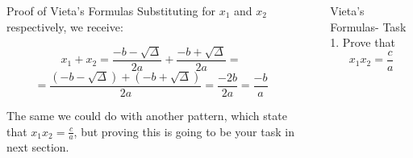 \documentclass[final]{beamer}
\newlength{\sepwid}
\newlength{\onecolwid}
\newlength{\twocolwid}
\begin{document}
\begin{frame}[t]
\begin{columns}[t]
\begin{column}{\twocolwid}
\begin{columns}[t,totalwidth=\twocolwid]
\begin{column}{\onecolwid}
\begin{block}{ Proof of Vieta's Formulas}
                        Substituting for $x_1$ and $x_2$ respectively, we receive:

                        $$x_1 + x_2 = \frac{-b-\sqrt{\Delta}}{2a} + \frac{-b+\sqrt{\Delta}}{2a} =$$
                        $$ = \frac{(-b-\sqrt{\Delta}) + (-b+\sqrt{\Delta})}{2a} = \frac{-2b}{2a} = \frac{-b}{a}$$

                        The same we could do with another pattern, which state that $x_1 x_2 = \frac{c}{a}$, but proving this is going to be your task in next section.

                    \end{block}


                \end{column} %

            \end{columns} %

        \end{column} %

        \begin{column}{\sepwid}\end{column} %

        \begin{column}{\onecolwid} %


            \begin{block}{Vieta's Formulas- Task}
                1. Prove that $$x_1x_2 = \frac{c}{a}$$
                \[\]
                \[\]
                \[\]
                \[\]
                \[\]

            \end{block}





\end{column}
\end{columns}
\end{frame}
\end{document}
